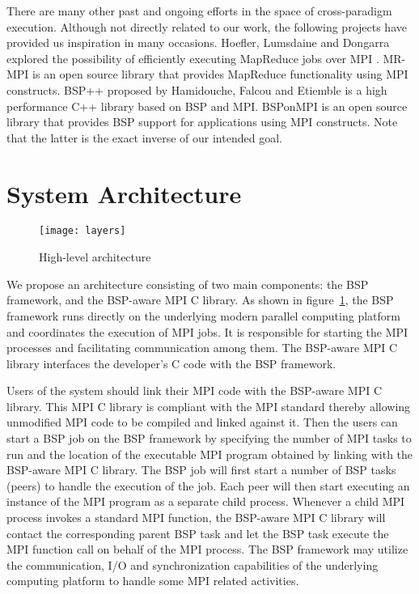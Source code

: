 \documentclass[conference,10pt] {IEEEtran}
\begin{document}
There are many other past and ongoing efforts in the space of cross-paradigm execution. Although not directly related to our work, the following projects have provided us inspiration in many occasions. Hoefler, Lumsdaine and Dongarra explored the possibility of efficiently executing MapReduce jobs over MPI \cite{Hoefler:2009:TEM:1612208.1612248}. MR-MPI \cite{url:mrmpi} is an open source library that provides MapReduce functionality using MPI constructs. BSP++ \cite{Hamidouche:2010:HBS:1863482.1863494} proposed by Hamidouche, Falcou and Etiemble is a high performance C++ library based on BSP and MPI. BSPonMPI \cite{url:bsponmpi} is an open source library that provides BSP support for applications using MPI constructs. Note that the latter is the exact inverse of our intended goal.

\section{System Architecture}
\label{sec:design}
\begin{figure}
\centering
\texttt{[image: layers]}
\caption{High-level architecture}
\label{fig:layers}
\end{figure}
We propose an architecture consisting of two main components: the BSP framework, and the BSP-aware MPI C library. As shown in figure~\ref{fig:layers}, the BSP framework runs directly on the underlying modern parallel computing platform and coordinates the execution of MPI jobs. It is responsible for starting the MPI processes and facilitating communication among them. The BSP-aware MPI C library interfaces the developer's C code with the BSP framework.
 
Users of the system should link their MPI code with the BSP-aware MPI C library. This MPI C library is compliant with the MPI standard thereby allowing unmodified MPI code to be compiled and linked against it. Then the users can start a BSP job on the BSP framework by specifying the number of MPI tasks to run and the location of the executable MPI program obtained by linking with the BSP-aware MPI C library. The BSP job will first start a number of BSP tasks (peers) to handle the execution of the job. Each peer will then start executing an instance of the MPI program as a separate child process. Whenever a child MPI process invokes a standard MPI function, the BSP-aware MPI C library will contact the corresponding parent BSP task and let the BSP task execute the MPI function call on behalf of the MPI process. The BSP framework may utilize the communication, I/O and synchronization capabilities of the underlying computing platform to handle some MPI related activities. 
\end{document}
